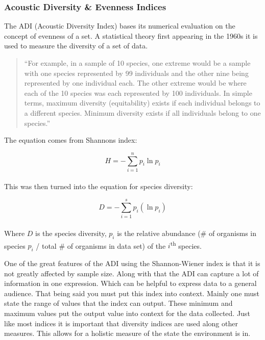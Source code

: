 \subsubsection{Acoustic Diversity \& Evenness Indices}
The ADI (Acoustic Diversity Index) bases its numerical evaluation on the concept of evenness of a set. A statistical theory first appearing in the 1960\textquotesingle s it is used to measure the diversity of a set of data.\par

\begin{quote}
  ``For example, in a sample of 10 species, one extreme would be a sample with one species represented by 99 individuals and the other nine being represented by one individual each. The other extreme would be where each of the 10 species was each represented by 100 individuals. In simple terms, maximum diversity (equitability) exists if each individual belongs to a different species. Minimum diversity exists if all individuals belong to one species.''\cite{shannonWiener}
\end{quote}

The equation comes from Shannon\textquotesingle s index:\par

\begin{equation}
  H = -\sum_{i=1}^n{p_i \ln p_i}
\end{equation} \\[-24pt]

This was then turned into the equation for species diversity:\par

\begin{equation}
  D = -\sum_{i=1}^s{p_i (\ln p_i)}
\end{equation} \\[-24pt]

Where $D$ is the species diversity, $p_i$ is the relative abundance (\# of organisms in species $p_i$ / total \# of organisms in data set) of the $i$\textsuperscript{th} species.\par
One of the great features of the ADI using the Shannon-Wiener index is that it is not greatly affected by sample size. Along with that the ADI can capture a lot of information in one expression. Which can be helpful to express data to a general audience. That being said you must put this index into context. Mainly one must state the range of values that the index can output. These minimum and maximum values put the output value into context for the data collected. Just like most indices it is important that diversity indices are used along other measures. This allows for a holistic measure of the state the environment is in.\cite{shannonWiener}\par
